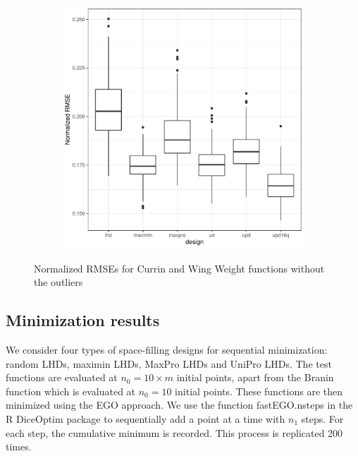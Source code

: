 \documentclass [PhD] {package/uclathes}
\begin{document}
\begin{figure}
\begin{subfigure}[b]{0.45\textwidth}
\includegraphics[width=\textwidth]{chapters/EGO/pdfs/Wingweight_128x31_no_outlier}
\end{subfigure}
\caption{Normalized RMSEs for Currin and Wing Weight functions without the outliers}
\label{fig:no_outlier}
\end{figure}


\clearpage
\subsection{Minimization results}

We consider four types of space-filling designs for sequential minimization: random LHDs, maximin LHDs, MaxPro LHDs and UniPro LHDs. The test functions are evaluated at $n_0 = 10\times m$ initial points, apart from the Branin function which is evaluated at $n_0 = 10$ initial points. These functions are then minimized using the EGO approach. We use the function fastEGO.nsteps in the R DiceOptim package to sequentially add a point at a time with $n_1$ steps. For each step, the cumulative minimum is recorded. This process is replicated 200 times.
\end{document}
